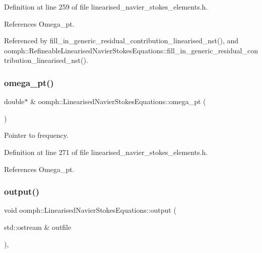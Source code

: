 Definition at line 259 of file linearised\+\_\+navier\+\_\+stokes\+\_\+elements.\+h.



References Omega\+\_\+pt.



Referenced by fill\+\_\+in\+\_\+generic\+\_\+residual\+\_\+contribution\+\_\+linearised\+\_\+nst(), and oomph\+::\+Refineable\+Linearised\+Navier\+Stokes\+Equations\+::fill\+\_\+in\+\_\+generic\+\_\+residual\+\_\+contribution\+\_\+linearised\+\_\+nst().

\mbox{\label{classoomph_1_1LinearisedNavierStokesEquations_a533ad8fff1ae8872b56796137f07ad0f}} 
\subsubsection{\texorpdfstring{omega\+\_\+pt()}{omega\_pt()}}
{\footnotesize\ttfamily double$\ast$ \& oomph\+::\+Linearised\+Navier\+Stokes\+Equations\+::omega\+\_\+pt (\begin{DoxyParamCaption}{ }\end{DoxyParamCaption})\hspace{0.3cm}{\ttfamily [inline]}}



Pointer to frequency. 



Definition at line 271 of file linearised\+\_\+navier\+\_\+stokes\+\_\+elements.\+h.



References Omega\+\_\+pt.

\mbox{\label{classoomph_1_1LinearisedNavierStokesEquations_a87e366a3fe677cbbb99f4cba17d0f4c6}} 
\subsubsection{\texorpdfstring{output()}{output()}\hspace{0.1cm}{\footnotesize\ttfamily [1/4]}}
{\footnotesize\ttfamily void oomph\+::\+Linearised\+Navier\+Stokes\+Equations\+::output (\begin{DoxyParamCaption}\item[{std\+::ostream \&}]{outfile }\end{DoxyParamCaption})\hspace{0.3cm}{\ttfamily [inline]}, {\ttfamily [virtual]}}



